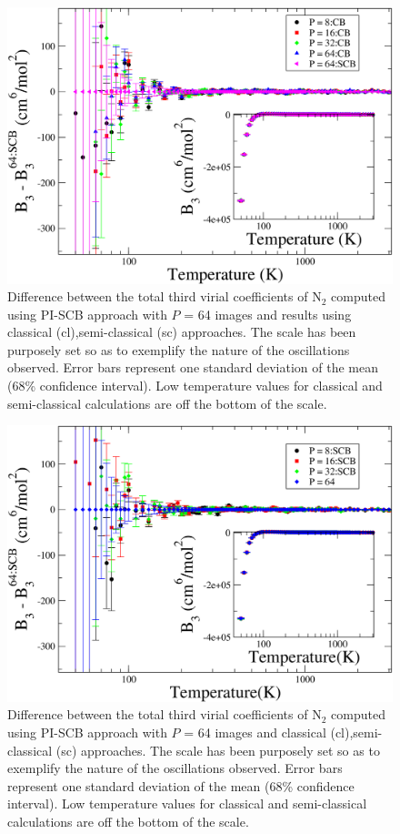         \begin{figure}[!htbp]
            \centering
            \includegraphics[scale=0.20,keepaspectratio]{Chapter-5/Figures/B3N2AllPIDiff.png}
            \caption{Difference between the total third virial coefficients of N$_2$ computed using PI-SCB approach with $P$ = 64 images and results using classical (cl),semi-classical (sc) approaches. The scale has been purposely set so as to exemplify the nature of the oscillations observed. Error bars represent one standard deviation of the mean (68\% confidence interval). Low temperature values for classical and semi-classical calculations are off the bottom of the scale.}
            \label{fig:B3N2AllPIDiff}
        \end{figure}
        \begin{figure}[!htbp]
            \centering
            \includegraphics[scale=0.20,keepaspectratio]{Chapter-5/Figures/B3N2AllSCBDiff.png}
            \caption{Difference between the total third virial coefficients of N$_2$ computed using PI-SCB approach with $P$ = 64 images and classical (cl),semi-classical (sc) approaches. The scale has been purposely set so as to exemplify the nature of the oscillations observed. Error bars represent one standard deviation of the mean (68\% confidence interval). Low temperature values for classical and semi-classical calculations are off the bottom of the scale.}
            \label{fig:B3N2AllSCBDiff}
        \end{figure}

